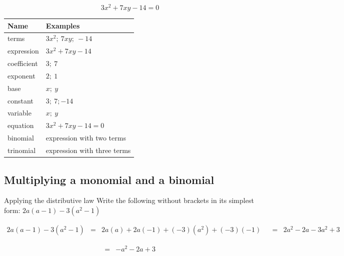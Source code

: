 \begin{equation*}
3x^2 + 7xy -14 = 0
\end{equation*}



\begin{table}[H]
\begin{center}
\begin{tabular}{|l|l|}
\hline
\textbf{Name} & \textbf{Examples} \\
\hline
terms & $3x^2;~ 7xy;~ -14$\\ \hline
expression & $3x^2 + 7xy -14$\\ \hline
coefficient & $3;~7$\\ \hline
exponent & $2;~1$\\ \hline
base & $x;~y$\\ \hline
constant & $3;~7;-14$\\ \hline
variable & $x;~ y$\\ \hline
equation & $3x^2 + 7xy -14 = 0$\\ \hline
binomial & expression with two terms\\ \hline
trinomial & expression with three terms \\ \hline
\end{tabular}
\end{center}
\end{table} 

\par
\label{m39383*uid4}
\subsection*{Multiplying a monomial and a binomial}

\begin{wex}{Applying the distributive law}
{Write the following without brackets in its simplest form: $2a(a-1) - 3(a^{2}-1)$}
{
\begin{equation*}
 \begin{array}{lll} 2a(a-1) -3(a^{2}-1) &=& 2a(a) + 2a(-1) + (-3)(a^{2})+(-3)(-1) &
  &=& 2a^{2} - 2a - 3a^{2} + 3
 \end{array}
\end{equation*}

\begin{equation*}
 \begin{array}{lll} &=& -a^{2} -2a + 3 & 
 \end{array}
\end{equation*}


}


\end{wex}

